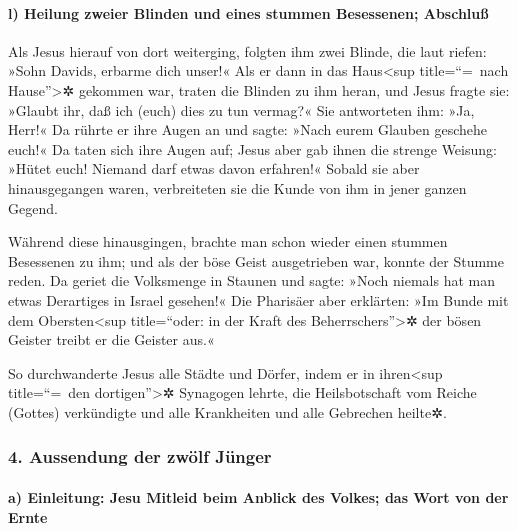 \hypertarget{l-heilung-zweier-blinden-und-eines-stummen-besessenen-abschluuxdf}{%
\paragraph{l) Heilung zweier Blinden und eines stummen Besessenen;
Abschluß}\label{l-heilung-zweier-blinden-und-eines-stummen-besessenen-abschluuxdf}}

 Als Jesus hierauf von dort weiterging, folgten ihm zwei
Blinde, die laut riefen: »Sohn Davids, erbarme dich unser!«
 Als er dann in das Haus\textless sup title=``=~nach
Hause''\textgreater✲ gekommen war, traten die Blinden zu ihm heran, und
Jesus fragte sie: »Glaubt ihr, daß ich (euch) dies zu tun vermag?« Sie
antworteten ihm: »Ja, Herr!«  Da rührte er ihre Augen an
und sagte: »Nach eurem Glauben geschehe euch!«  Da taten
sich ihre Augen auf; Jesus aber gab ihnen die strenge Weisung: »Hütet
euch! Niemand darf etwas davon erfahren!«  Sobald sie
aber hinausgegangen waren, verbreiteten sie die Kunde von ihm in jener
ganzen Gegend.

 Während diese hinausgingen, brachte man schon wieder
einen stummen Besessenen zu ihm;  und als der böse Geist
ausgetrieben war, konnte der Stumme reden. Da geriet die Volksmenge in
Staunen und sagte: »Noch niemals hat man etwas Derartiges in Israel
gesehen!«  Die Pharisäer aber erklärten: »Im Bunde mit
dem Obersten\textless sup title=``oder: in der Kraft des
Beherrschers''\textgreater✲ der bösen Geister treibt er die Geister
aus.«

 So durchwanderte Jesus alle Städte und Dörfer, indem er
in ihren\textless sup title=``=~den dortigen''\textgreater✲ Synagogen
lehrte, die Heilsbotschaft vom Reiche (Gottes) verkündigte und alle
Krankheiten und alle Gebrechen heilte✲.

\hypertarget{aussendung-der-zwuxf6lf-juxfcnger}{%
\subsubsection{4. Aussendung der zwölf
Jünger}\label{aussendung-der-zwuxf6lf-juxfcnger}}

\hypertarget{a-einleitung-jesu-mitleid-beim-anblick-des-volkes-das-wort-von-der-ernte}{%
\paragraph{a) Einleitung: Jesu Mitleid beim Anblick des Volkes; das Wort
von der
Ernte}\label{a-einleitung-jesu-mitleid-beim-anblick-des-volkes-das-wort-von-der-ernte}}

